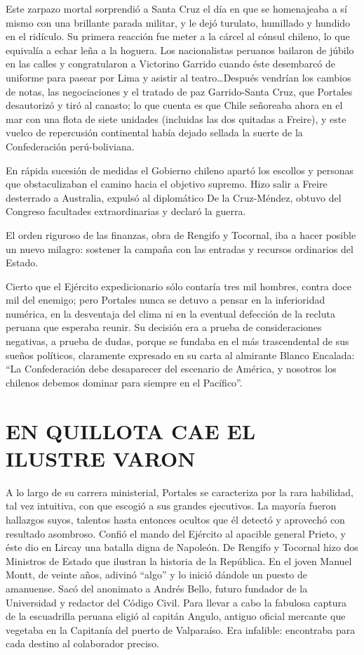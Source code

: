\documentclass[10pt,twoside,openright]{memoir}
\begin{document}
Este zarpazo mortal sorprendió a Santa Cruz el día en que se homenajeaba
a sí mismo con una brillante parada militar, y le dejó turulato,
humillado y hundido en el ridículo. Su primera reacción fue meter a la
cárcel al cónsul chileno, lo que equivalía a echar leña a la hoguera.
Los nacionalistas peruanos bailaron de júbilo en las calles y
congratularon a Victorino Garrido cuando éste desembarcó de uniforme
para pasear por Lima y asistir al teatro\ldots Después vendrían los cambios
de notas, las negociaciones y el tratado de paz Garrido-Santa Cruz, que
Portales desautorizó y tiró al canasto; lo que cuenta es que Chile
señoreaba ahora en el mar con una flota de siete unidades (incluidas las
dos quitadas a Freire), y este vuelco de repercusión continental había
dejado sellada la suerte de la Confederación perú-boliviana.

En rápida sucesión de medidas el Gobierno chileno apartó los escollos y
personas que obstaculizaban el camino hacia el objetivo supremo. Hizo
salir a Freire desterrado a Australia, expulsó al diplomático De la
Cruz-Méndez, obtuvo del Congreso facultades extraordinarias y declaró la
guerra.

El orden riguroso de las finanzas, obra de Rengifo y Tocornal, iba a
hacer posible un nuevo milagro: sostener la campaña con las entradas y
recursos ordinarios del Estado.

Cierto que el Ejército expedicionario sólo contaría tres mil hombres,
contra doce mil del enemigo; pero Portales nunca se detuvo a pensar en
la inferioridad numérica, en la desventaja del clima ni en la eventual
defección de la recluta peruana que esperaba reunir. Su decisión era a
prueba de consideraciones negativas, a prueba de dudas, porque se
fundaba en el más trascendental de sus sueños políticos, claramente
expresado en su carta al almirante Blanco Encalada: ``La Confederación
debe desaparecer del escenario de América, y nosotros los chilenos
debemos dominar para siempre en el Pacífico''.

\chapter{EN QUILLOTA CAE EL ILUSTRE VARON}

A lo largo de su carrera ministerial, Portales se caracteriza por la
rara habilidad, tal vez intuitiva, con que escogió a sus grandes
ejecutivos. La mayoría fueron hallazgos suyos, talentos hasta entonces
ocultos que él detectó y aprovechó con resultado asombroso. Confió el
mando del Ejército al apacible general Prieto, y éste dio en Lircay una
batalla digna de Napoleón. De Rengifo y Tocornal hizo dos Ministros de
Estado que ilustran la historia de la República. En el joven Manuel
Montt, de veinte años, adivinó ``algo'' y lo inició dándole un puesto de
amanuense. Sacó del anonimato a Andrés Bello, futuro fundador de la
Universidad y redactor del Código Civil. Para llevar a cabo la fabulosa
captura de la escuadrilla peruana eligió al capitán Angulo, antiguo
oficial mercante que vegetaba en la Capitanía del puerto de Valparaíso.
Era infalible: encontraba para cada destino al colaborador preciso.
\end{document}
